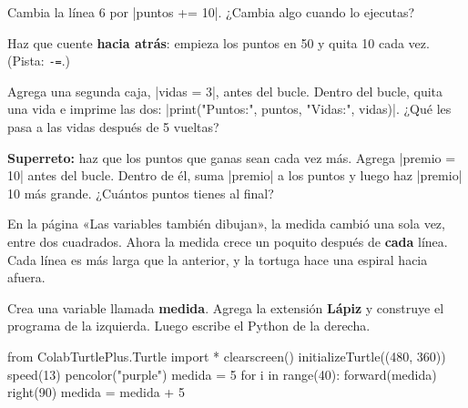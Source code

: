 \begin{challenge}
\tick Cambia la línea 6 por \py|puntos += 10|. ¿Cambia algo cuando lo ejecutas?\par
\tick Haz que cuente \textbf{hacia atrás}: empieza los puntos en 50 y quita 10 cada vez. (Pista: \texttt{-=}.)\par
\tick Agrega una segunda caja, \py|vidas = 3|, antes del bucle. Dentro del bucle, quita una vida e imprime las dos: \py|print("Puntos:", puntos, "Vidas:", vidas)|. ¿Qué les pasa a las vidas después de 5 vueltas?\par
\tick \textbf{Superreto:} haz que los puntos que ganas sean cada vez más. Agrega \py|premio = 10| antes del bucle. Dentro de él, suma \py|premio| a los puntos y luego haz \py|premio| 10 más grande. ¿Cuántos puntos tienes al final?
\end{challenge}


En la página «Las variables también dibujan», la medida cambió una sola vez, entre dos cuadrados. Ahora la medida crece un poquito después de \textbf{cada} línea. Cada línea es más larga que la anterior, y la tortuga hace una espiral hacia afuera.

Crea una variable llamada \textbf{medida}. Agrega la extensión \textbf{Lápiz} y construye el programa de la izquierda. Luego escribe el Python de la derecha.

\noindent\begin{minipage}[t]{0.37\linewidth}\vspace{0pt}
\begin{scratch}
\end{scratch}
\end{minipage}\hfill\begin{minipage}[t]{0.61\linewidth}\vspace{0pt}
\begin{typethis}
from ColabTurtlePlus.Turtle import *
clearscreen()
initializeTurtle((480, 360))
speed(13)
pencolor("purple")
medida = 5
for i in range(40):
    forward(medida)
    right(90)
    medida = medida + 5
\end{typethis}
\end{minipage}

